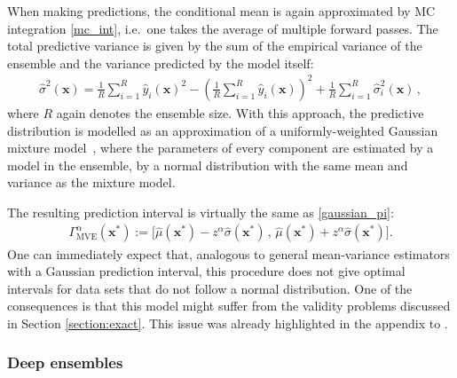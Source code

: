 \documentclass[smallcondensed]{svjour3}
\begin{document}
    When making predictions, the conditional mean is again approximated by MC integration \eqref{mc_int}, i.e.\ one takes the average of multiple forward passes. The total predictive variance is given by the sum of the empirical variance of the ensemble and the variance predicted by the model itself:
    \begin{gather}
        \label{dropout_mve_var}
        \hat{\sigma}^2(\mathbf{x}) = \frac{1}{R}\sum_{i=1}^R\hat{y}_i(\mathbf{x})^2 - \left(\frac{1}{R}\sum_{i=1}^R\hat{y}_i(\mathbf{x})\right)^2 + \frac{1}{R}\sum_{i=1}^R\hat{\sigma}^2_i(\mathbf{x})\,,
    \end{gather}
    where $R$ again denotes the ensemble size. With this approach, the predictive distribution is modelled as an approximation of a uniformly-weighted Gaussian mixture model~\cite{reynolds2009gaussian}, where the parameters of every component are estimated by a model in the ensemble, by a normal distribution with the same mean and variance as the mixture model.

    The resulting prediction interval is virtually the same as \eqref{gaussian_pi}:
    \begin{gather}
        \label{mve_interval}
        \Gamma^\alpha_\mathrm{MVE}(\mathbf{x}^*) := \big[\hat{\mu}(\mathbf{x}^*) - z^\alpha\hat{\sigma}(\mathbf{x}^*)\,,\,\hat{\mu}(\mathbf{x}^*) + z^\alpha\hat{\sigma}(\mathbf{x}^*)\big].
    \end{gather}
    One can immediately expect that, analogous to general mean-variance estimators with a Gaussian prediction interval, this procedure does not give optimal intervals for data sets that do not follow a normal distribution. One of the consequences is that this model might suffer from the validity problems discussed in Section \ref{section:exact}. This issue was already highlighted in the appendix to \cite{gal2016dropout}.

\subsubsection*{Deep ensembles}
\end{document}
